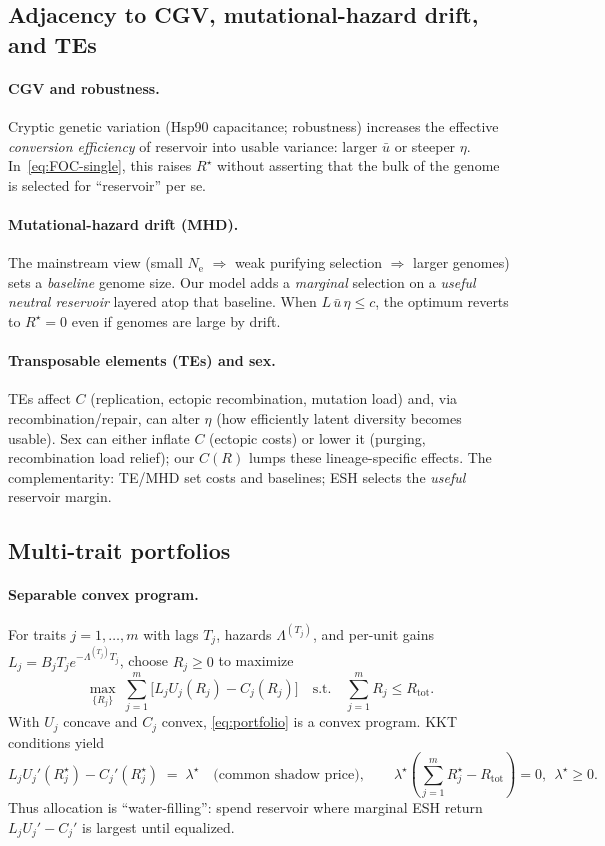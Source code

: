 \documentclass[11pt]{article}
\theoremstyle{upright}
\newcommand{\Ne}{N_{\mathrm{e}}}
\begin{document}
\subsection{Adjacency to CGV, mutational-hazard drift, and TEs}
\paragraph{CGV and robustness.}
Cryptic genetic variation (Hsp90 capacitance; robustness) increases the effective \emph{conversion efficiency} of reservoir into usable variance: larger $\bar u$ or steeper $\eta$. In~\eqref{eq:FOC-single}, this raises $R^\star$ without asserting that the bulk of the genome is selected for “reservoir” per se.

\paragraph{Mutational-hazard drift (MHD).}
The mainstream view (small $\Ne$ $\Rightarrow$ weak purifying selection $\Rightarrow$ larger genomes) sets a \emph{baseline} genome size. Our model adds a \emph{marginal} selection on a \emph{useful neutral reservoir} layered atop that baseline. When $L\,\bar u\,\eta\le c$, the optimum reverts to $R^\star=0$ even if genomes are large by drift.

\paragraph{Transposable elements (TEs) and sex.}
TEs affect $C$ (replication, ectopic recombination, mutation load) and, via recombination/repair, can alter $\eta$ (how efficiently latent diversity becomes usable). Sex can either inflate $C$ (ectopic costs) or lower it (purging, recombination load relief); our $C(R)$ lumps these lineage-specific effects. The complementarity: TE/MHD set costs and baselines; ESH selects the \emph{useful} reservoir margin.

\subsection{Multi-trait portfolios}
\paragraph{Separable convex program.}
For traits $j=1,\dots,m$ with lags $T_j$, hazards $\Lambda^{(T_j)}$, and per-unit gains $L_j=B_j T_j e^{-\Lambda^{(T_j)}T_j}$, choose $R_j\ge 0$ to maximize
\begin{equation}\label{eq:portfolio}
\max_{\{R_j\}}\;\sum_{j=1}^m \big[L_j U_j(R_j)-C_j(R_j)\big]
\quad\text{s.t.}\quad \sum_{j=1}^m R_j \le R_{\mathrm{tot}}.
\end{equation}
With $U_j$ concave and $C_j$ convex, \eqref{eq:portfolio} is a convex program. KKT conditions yield
\[
L_j U_j'(R_j^\star)-C_j'(R_j^\star) \;=\; \lambda^\star \quad\text{(common shadow price)},\qquad
\lambda^\star\!\left(\sum_{j=1}^m R_j^\star-R_{\mathrm{tot}}\right)=0,\ \ \lambda^\star\ge 0.
\]
Thus allocation is “water-filling”: spend reservoir where marginal ESH return $L_j U_j'-C_j'$ is largest until equalized.
\end{document}
